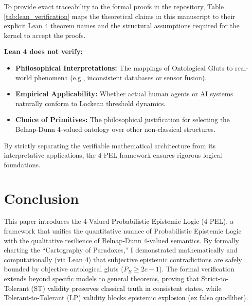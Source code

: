 \documentclass[11pt,a4paper]{article}
\begin{document}
To provide exact traceability to the formal proofs in the repository, Table \ref{tab:lean_verification} maps the theoretical claims in this manuscript to their explicit Lean 4 theorem names and the structural assumptions required for the kernel to accept the proofs.

\begin{table}[ht]
\centering
{}
\caption{Mapping of manuscript theorems to exact Lean 4 formalizations.}
\label{tab:lean_verification}
\end{table}
\textbf{Lean 4 does not verify:}
\begin{itemize}
    \item \textbf{Philosophical Interpretations:} The mappings of Ontological Gluts to real-world phenomena (e.g., inconsistent databases or sensor fusion).
    \item \textbf{Empirical Applicability:} Whether actual human agents or AI systems naturally conform to Lockean threshold dynamics.
    \item \textbf{Choice of Primitives:} The philosophical justification for selecting the Belnap-Dunn 4-valued ontology over other non-classical structures.
\end{itemize}

By strictly separating the verifiable mathematical architecture from its interpretative applications, the 4-PEL framework ensures rigorous logical foundations.


\section{Conclusion}
\label{sec:conclusion}

This paper introduces the 4-Valued Probabilistic Epistemic Logic (4-PEL), a framework that unifies the quantitative nuance of Probabilistic Epistemic Logic with the qualitative resilience of Belnap-Dunn 4-valued semantics. By formally charting the ``Cartography of Paradoxes,'' I demonstrated mathematically and computationally (via Lean 4) that subjective epistemic contradictions are safely bounded by objective ontological gluts ($P_B \ge 2c - 1$). The formal verification extends beyond specific models to general theorems, proving that Strict-to-Tolerant (ST) validity preserves classical truth in consistent states, while Tolerant-to-Tolerant (LP) validity blocks epistemic explosion (ex falso quodlibet).
\end{document}
